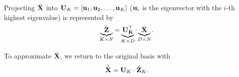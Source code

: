 Projecting \(\bar{\mathbf{X}}\) into \(\mathbf{U}_K = [\mathbf{u}_1, \mathbf{u}_2, \ldots, \mathbf{u}_K]\) (\(\mathbf{u}_i\) is the eigenvector with the \(i\)-th highest eigenvalue) is represented by \[
\underbrace{\bar{\matr{Z}}}_{\mathclap{K \times N}} = \underbrace{\matr{U_K^\top}}_{\mathclap{K \times D}} \cdot \underbrace{\bar{\matr{X}}}_{\mathclap{D \times N}}.
\]

To approximate \(\bar{\mathbf{X}}\), we return to the original basis with \[
\tilde{\bar{\mathbf{X}}} = \mathbf{U}_K \cdot \tilde{\mathbf{Z}}_K.
\]

